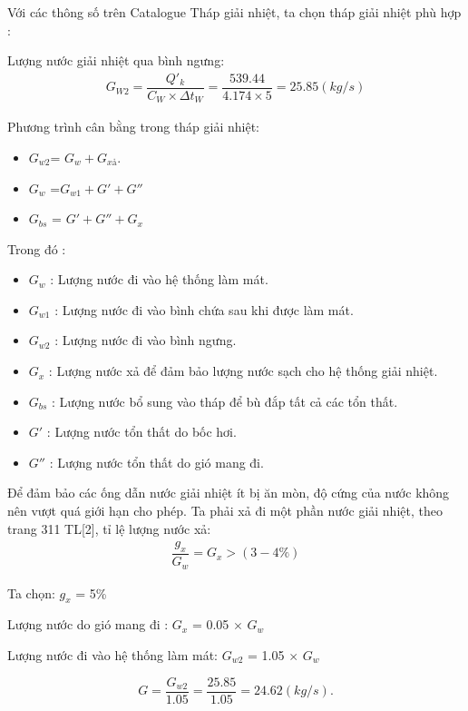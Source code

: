 Với các thông số trên Catalogue Tháp giải nhiệt, ta chọn tháp giải nhiệt phù hợp : 

Lượng nước giải nhiệt qua bình ngưng:
\begin{equation*}
	\begin{split}
		G_{W2} = \dfrac{Q'_{k}}{C_{W} \times \Delta t_{W}}= \dfrac{539.44}{4.174 \times 5}=25.85(kg/s)
	\end{split}
\end{equation*}

Phương trình cân bằng trong tháp giải nhiệt:
\begin{itemize}
	\item $G_{w2}$= $G_{w} + G_{xả}$.
	\item $G_{w}$ =$ G_{w1} + G' + G''$
	\item $G_{bs}$ = $G' + G'' + G_{x}$
\end{itemize}

Trong đó :
\begin{itemize}
	\item $G_{w}$ : Lượng nước đi vào hệ thống làm mát.
	\item $G_{w1}$ : Lượng nước đi vào bình chứa sau khi được làm mát.
	\item $G_{w2}$ : Lượng nước đi vào bình ngưng.
	\item $G_{x}$ : Lượng nước xả để đảm bảo lượng nước sạch cho hệ thống giải nhiệt.
	\item $G_{bs}$ : Lượng nước bổ sung vào tháp để bù đắp tất cả các tổn thất.
	\item $G'$ : Lượng nước tổn thất do bốc hơi.
	\item $G''$ : Lượng nước tổn thất do gió mang đi.
\end{itemize}

Để đảm bảo các ống dẫn nước giải nhiệt ít bị ăn mòn, độ cứng của nước không nên vượt quá giới hạn cho phép. Ta phải xả đi một phần nước giải nhiệt, theo trang 311 TL[2], tỉ lệ lượng nước xả:
\begin{equation*}
  \begin{split}
  	\dfrac{g_{x}}{G_{w}} = G_{x} > (3 - 4 \% )
  \end{split}	
\end{equation*}

Ta chọn: $g_{x}$ = 5\%

Lượng nước do gió mang đi : $G_{x}$ = 0.05 $\times$ $G_{w}$

Lượng nước đi vào hệ thống làm mát: $G_{w2}$ = 1.05 $\times$ $G_{w}$

\begin{equation*}
	 G = \dfrac{G_{w2}}{1.05}= \dfrac{25.85}{1.05}=24.62(kg/s).
\end{equation*}

